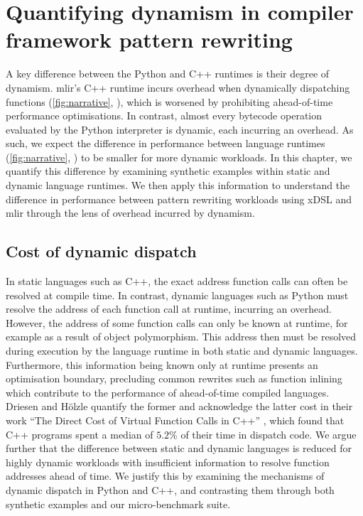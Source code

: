 \chapter{Quantifying dynamism in compiler framework pattern rewriting}
\label{chap:dynamism-pattern-rewriting}

A key difference between the Python and C++ runtimes is their degree of dynamism.
\ac{mlir}'s C++ runtime incurs overhead when dynamically dispatching functions (\autoref{fig:narrative}, ), which is worsened by prohibiting ahead-of-time performance optimisations. In contrast, almost every bytecode operation evaluated by the Python interpreter is dynamic, each incurring an overhead.
As such, we expect the difference in performance between language runtimes (\autoref{fig:narrative}, ) to be smaller for more dynamic workloads.
In this chapter, we quantify this difference by examining synthetic examples within static and dynamic language runtimes. We then apply this information to understand the difference in performance between pattern rewriting workloads using xDSL and \ac{mlir} through the lens of overhead incurred by dynamism.


\section{Cost of dynamic dispatch}
\label{sec:dynamism-pattern-rewriting-dispatch}

In static languages such as C++, the exact address function calls can often be resolved at compile time. In contrast, dynamic languages such as Python must resolve the address of each function call at runtime, incurring an overhead.
However, the address of some function calls can only be known at runtime, for example as a result of object polymorphism. This address then must be resolved during execution by the language runtime in both static and dynamic languages. Furthermore, this information being known only at runtime presents an optimisation boundary, precluding common rewrites such as function inlining which contribute to the performance of ahead-of-time compiled languages.
Driesen and H\"olzle quantify the former and acknowledge the latter cost in their work ``The Direct Cost of Virtual Function Calls in C++'' \cite{driesenDirectCostVirtual1996}, which found that C++ programs spent a median of $5.2\%$ of their time in dispatch code. %
We argue further that the difference between static and dynamic languages is reduced for highly dynamic workloads with insufficient information to resolve function addresses ahead of time.
We justify this by examining the mechanisms of dynamic dispatch in Python and C++, and contrasting them through both synthetic examples and our micro-benchmark suite.

